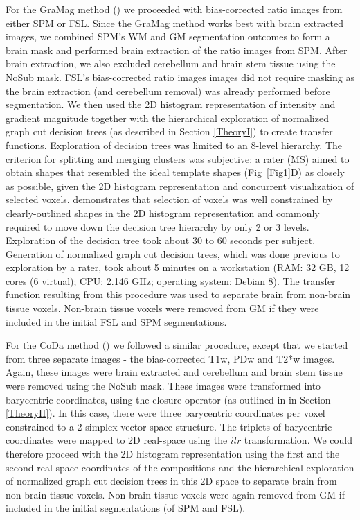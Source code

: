 For the GraMag method () we proceeded with bias-corrected ratio images from either SPM or FSL. Since the GraMag method works best with brain extracted images, we combined SPM's WM and GM segmentation outcomes to form a brain mask and performed brain extraction of the ratio images from SPM. After brain extraction, we also excluded cerebellum and brain stem tissue using the NoSub mask. FSL's bias-corrected ratio images images did not require masking as the brain extraction (and cerebellum removal) was already performed before segmentation. We then used the 2D histogram representation of intensity and gradient magnitude together with the hierarchical exploration of normalized graph cut decision trees (as described in Section \ref{TheoryI}) to create transfer functions. Exploration of decision trees was limited to an 8-level hierarchy. The criterion for splitting and merging clusters was subjective: a rater (MS) aimed to obtain shapes that resembled the ideal template shapes (Fig~\ref{Fig1}D) as closely as possible, given the 2D histogram representation and concurrent visualization of selected voxels.  demonstrates that selection of voxels was well constrained by clearly-outlined shapes in the 2D histogram representation and commonly required to move down the decision tree hierarchy by only 2 or 3 levels. Exploration of the decision tree took about 30 to 60 seconds per subject. Generation of normalized graph cut decision trees, which was done previous to exploration by a rater, took about 5 minutes on a workstation  (RAM: 32 GB, 12 cores (6 virtual); CPU: 2.146 GHz; operating system: Debian 8). The transfer function resulting from this procedure was used to separate brain from non-brain tissue voxels. Non-brain tissue voxels were removed from GM if they were included in the initial FSL and SPM segmentations.

For the CoDa method () we followed a similar procedure, except that we started from three separate images - the bias-corrected T1w, PDw and T2*w images. Again, these images were brain extracted and cerebellum and brain stem tissue were removed using the NoSub mask. These images were transformed into barycentric coordinates, using the closure operator (as outlined in in Section \ref{TheoryII}). In this case, there were three barycentric coordinates per voxel constrained to a 2-simplex vector space structure. The triplets of barycentric coordinates were mapped to 2D real-space using the $ilr$ transformation. We could therefore proceed with the 2D histogram representation using the first and the second real-space coordinates of the compositions and the hierarchical exploration of normalized graph cut decision trees in this 2D space to separate brain from non-brain tissue voxels. Non-brain tissue voxels were again removed from GM if included in the initial segmentations (of SPM and FSL).

